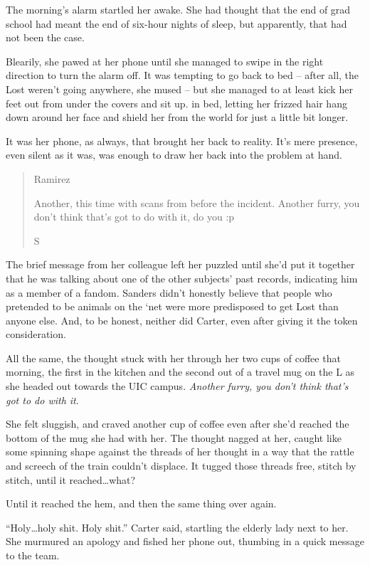 \secdiv

The morning's alarm startled her awake. She had thought that the end of grad school had meant the end of six-hour nights of sleep, but apparently, that had not been the case.

Blearily, she pawed at her phone until she managed to swipe in the right direction to turn the alarm off. It was tempting to go back to bed -- after all, the Lost weren't going anywhere, she mused -- but she managed to at least kick her feet out from under the covers and sit up. in bed, letting her frizzed hair hang down around her face and shield her from the world for just a little bit longer.

It was her phone, as always, that brought her back to reality. It's mere presence, even silent as it was, was enough to draw her back into the problem at hand.

\begin{quotation}
  Ramirez

  Another, this time with scans from before the incident. Another furry, you don't think that's got to do with it, do you :p

  S
\end{quotation}

The brief message from her colleague left her puzzled until she'd put it together that he was talking about one of the other subjects' past records, indicating him as a member of a fandom. Sanders didn't honestly believe that people who pretended to be animals on the `net were more predisposed to get Lost than anyone else. And, to be honest, neither did Carter, even after giving it the token consideration.

All the same, the thought stuck with her through her two cups of coffee that morning, the first in the kitchen and the second out of a travel mug on the L as she headed out towards the UIC campus. \textit{Another furry, you don't think that's got to do with it}.

She felt sluggish, and craved another cup of coffee even after she'd reached the bottom of the mug she had with her. The thought nagged at her, caught like some spinning shape against the threads of her thought in a way that the rattle and screech of the train couldn't displace. It tugged those threads free, stitch by stitch, until it reached\ldots{}what?

Until it reached the hem, and then the same thing over again.

``Holy\ldots{}holy shit. Holy shit.'' Carter said, startling the elderly lady next to her. She murmured an apology and fished her phone out, thumbing in a quick message to the team.
